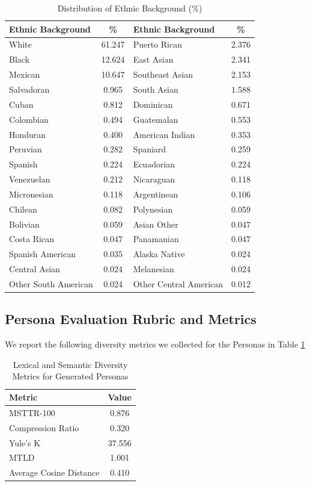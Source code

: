 \documentclass[11pt]{article}
\begin{document}
\begin{table}[H]
\centering
\caption{Distribution of Ethnic Background (\%)}
\begin{tabular}{|l c|l c|}
\hline
\textbf{Ethnic Background} & \textbf{\%} & 
\textbf{Ethnic Background} & \textbf{\%} \\
\hline
White & 61.247 & Puerto Rican & 2.376 \\
Black & 12.624 & East Asian & 2.341 \\
Mexican & 10.647 & Southeast Asian & 2.153 \\
Salvadoran & 0.965 & South Asian & 1.588 \\
Cuban & 0.812 & Dominican & 0.671 \\
Colombian & 0.494 & Guatemalan & 0.553 \\
Honduran & 0.400 & American Indian & 0.353 \\
Peruvian & 0.282 & Spaniard & 0.259 \\
Spanish & 0.224 & Ecuadorian & 0.224 \\
Venezuelan & 0.212 & Nicaraguan & 0.118 \\
Micronesian & 0.118 & Argentinean & 0.106 \\
Chilean & 0.082 & Polynesian & 0.059 \\
Bolivian & 0.059 & Asian Other & 0.047 \\
Costa Rican & 0.047 & Panamanian & 0.047 \\
Spanish American & 0.035 & Alaska Native & 0.024 \\
Central Asian & 0.024 & Melanesian & 0.024 \\
Other South American & 0.024 & Other Central American & 0.012 \\
\hline
\end{tabular}
\end{table}



\subsection{Persona Evaluation Rubric and Metrics}

We report the following diversity metrics we collected for the Personas in Table \ref{tab:persona_diversity_metrics}

\begin{table}[H]
\centering
\caption{Lexical and Semantic Diversity Metrics for Generated Personas}
\label{tab:persona_diversity_metrics}
\begin{tabularx}{\columnwidth}{|X|c|}
\hline
\textbf{Metric} & \textbf{Value} \\
\hline
MSTTR-100 & 0.876 \\
\hline
Compression Ratio & 0.320 \\
\hline
Yule's K & 37.556 \\
\hline
MTLD & 1.001 \\
\hline
Average Cosine Distance & 0.410 \\
\hline
\end{tabularx}
\end{table}
\end{document}
